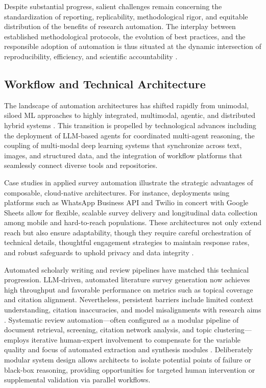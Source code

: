 Despite substantial progress, salient challenges remain concerning the standardization of reporting, replicability, methodological rigor, and equitable distribution of the benefits of research automation. The interplay between established methodological protocols, the evolution of best practices, and the responsible adoption of automation is thus situated at the dynamic intersection of reproducibility, efficiency, and scientific accountability \cite{ref28,ref29,ref30,ref31,ref37,ref38,ref43,ref51,ref61,ref62,ref78,ref80}.

\subsection{Workflow and Technical Architecture}

The landscape of automation architectures has shifted rapidly from unimodal, siloed ML approaches to highly integrated, multimodal, agentic, and distributed hybrid systems \cite{ref21,ref22,ref25,ref26,ref27,ref40,ref49,ref51,ref52,ref54,ref56,ref61,ref64,ref69,ref70,ref76,ref80,ref101,ref102,ref111,ref112,ref113,ref114,ref115}. This transition is propelled by technological advances including the deployment of LLM-based agents for coordinated multi-agent reasoning, the coupling of multi-modal deep learning systems that synchronize across text, images, and structured data, and the integration of workflow platforms that seamlessly connect diverse tools and repositories.

Case studies in applied survey automation illustrate the strategic advantages of composable, cloud-native architectures. For instance, deployments using platforms such as WhatsApp Business API and Twilio in concert with Google Sheets allow for flexible, scalable survey delivery and longitudinal data collection among mobile and hard-to-reach populations. These architectures not only extend reach but also ensure adaptability, though they require careful orchestration of technical details, thoughtful engagement strategies to maintain response rates, and robust safeguards to uphold privacy and data integrity \cite{ref117}. 

Automated scholarly writing and review pipelines have matched this technical progression. LLM-driven, automated literature survey generation now achieves high throughput and favorable performance on metrics such as topical coverage and citation alignment. Nevertheless, persistent barriers include limited context understanding, citation inaccuracies, and model misalignments with research aims \cite{ref61,ref70,ref80}. Systematic review automation—often configured as a modular pipeline of document retrieval, screening, citation network analysis, and topic clustering—employs iterative human-expert involvement to compensate for the variable quality and focus of automated extraction and synthesis modules \cite{ref29,ref51,ref52,ref54,ref62,ref63}. Deliberately modular system design allows architects to isolate potential points of failure or black-box reasoning, providing opportunities for targeted human intervention or supplemental validation via parallel workflows.


